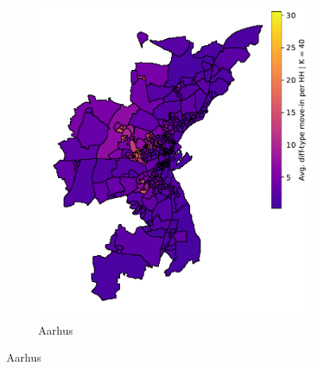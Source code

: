 \documentclass[../main.tex]{subfiles}
\begin{document}
\begin{figure}
\begin{subfigure}{.42\textwidth}
	\includegraphics[width=\textwidth]{figs/aarhus_howdy_neighbor.pdf}	
	\caption{Aarhus}
	\end{subfigure}
    

\end{figure}
\end{document}
